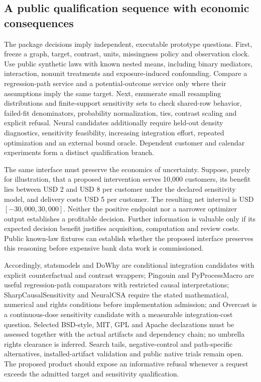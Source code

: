 \subsection{A public qualification sequence with economic consequences}
The package decisions imply independent, executable prototype questions. First, freeze a graph, target, contrast, units, missingness policy and observation clock. Use public synthetic laws with known nested means, including binary mediators, interaction, nonunit treatments and exposure-induced confounding. Compare a regression-path service and a potential-outcome service only where their assumptions imply the same target. Next, enumerate small resampling distributions and finite-support sensitivity sets to check shared-row behavior, failed-fit denominators, probability normalization, ties, contrast scaling and explicit refusal. Neural candidates additionally require held-out density diagnostics, sensitivity feasibility, increasing integration effort, repeated optimization and an external bound oracle. Dependent customer and calendar experiments form a distinct qualification branch. \citep{exec25_pymed_choice}

The same interface must preserve the economics of uncertainty. Suppose, purely for illustration, that a proposed intervention serves 10,000 customers, its benefit lies between USD 2 and USD 8 per customer under the declared sensitivity model, and delivery costs USD 5 per customer. The resulting net interval is USD $[-30{,}000,30{,}000]$. Neither the positive endpoint nor a narrower optimizer output establishes a profitable decision. Further information is valuable only if its expected decision benefit justifies acquisition, computation and review costs. Public known-law fixtures can establish whether the proposed interface preserves this reasoning before expensive bank data work is commissioned. \citep{exec25_pymed_choice}

Accordingly, statsmodels and DoWhy are conditional integration candidates with explicit counterfactual and contrast wrappers; Pingouin and PyProcessMacro are useful regression-path comparators with restricted causal interpretations; SharpCausalSensitivity and NeuralCSA require the stated mathematical, numerical and rights conditions before implementation admission; and Overcast is a continuous-dose sensitivity candidate with a measurable integration-cost question. Selected BSD-style, MIT, GPL and Apache declarations must be assessed together with the actual artifacts and dependency chain; no umbrella rights clearance is inferred. Search tails, negative-control and path-specific alternatives, installed-artifact validation and public native trials remain open. The proposed product should expose an informative refusal whenever a request exceeds the admitted target and sensitivity qualification. \citep{exec25_pymed_statsmodels,exec25_pymed_pingouin,exec25_pymed_dowhy,exec25_pymed_process,exec25_pymed_sharp,exec25_pymed_neuralcsa,exec25_pymed_overcast,exec25_pymed_choice}


